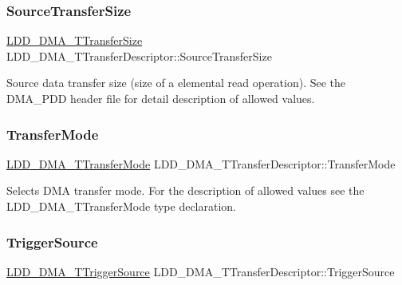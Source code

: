 \subsubsection{\texorpdfstring{Source\+Transfer\+Size}{SourceTransferSize}}
{\footnotesize\ttfamily \hyperlink{group___p_e___types__module_ga868f08f9448e5df27a38314f0893d84a}{L\+D\+D\+\_\+\+D\+M\+A\+\_\+\+T\+Transfer\+Size} L\+D\+D\+\_\+\+D\+M\+A\+\_\+\+T\+Transfer\+Descriptor\+::\+Source\+Transfer\+Size}

Source data transfer size (size of a elemental read operation). See the D\+M\+A\+\_\+\+P\+DD header file for detail description of allowed values. \mbox{\label{struct_l_d_d___d_m_a___t_transfer_descriptor_a0a932c1e965e131c25e45159f71831fe}} 
\subsubsection{\texorpdfstring{Transfer\+Mode}{TransferMode}}
{\footnotesize\ttfamily \hyperlink{group___p_e___types__module_gacd7d4c29cfce815e9e44755c0153f31b}{L\+D\+D\+\_\+\+D\+M\+A\+\_\+\+T\+Transfer\+Mode} L\+D\+D\+\_\+\+D\+M\+A\+\_\+\+T\+Transfer\+Descriptor\+::\+Transfer\+Mode}

Selects D\+MA transfer mode. For the description of allowed values see the L\+D\+D\+\_\+\+D\+M\+A\+\_\+\+T\+Transfer\+Mode type declaration. \mbox{\label{struct_l_d_d___d_m_a___t_transfer_descriptor_a770d0bde209b081eafe87892ed333084}} 
\subsubsection{\texorpdfstring{Trigger\+Source}{TriggerSource}}
{\footnotesize\ttfamily \hyperlink{group___p_e___types__module_ga8af21cbad27c8d061a98924a11fc5a9b}{L\+D\+D\+\_\+\+D\+M\+A\+\_\+\+T\+Trigger\+Source} L\+D\+D\+\_\+\+D\+M\+A\+\_\+\+T\+Transfer\+Descriptor\+::\+Trigger\+Source}

